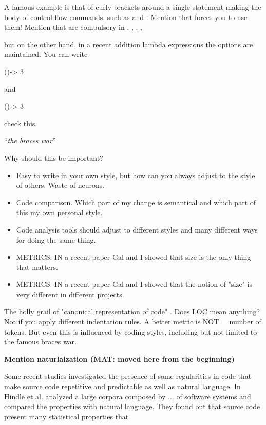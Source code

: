 A famous example is that of curly brackets around a single statement making
the body of control flow commands, such as  and 
.
Mention that \Go forces you to use them!
Mention that are compulsory in , 
,  
,  
,  

but on the other hand, in a recent addition lambda expressions\cite{lambda}
the options are maintained.
You can write
\begin{JAVA}
()-> 3
\end{JAVA}
and
\begin{JAVA}
  ()-> {3}
\end{JAVA}
check this.

``\emph{the braces war}''


Why should this be important?
\begin{itemize}
    \item Easy to write in  your own style, but how can 
      you always adjust to the style of others.
      Waste of neurons.
    \item Code comparison. Which part of my change is semantical and which 
      part of this my own personal style.
    \item Code analysis tools should adjust to different styles and many
        different ways for doing the same thing.
    \item METRICS: IN a recent paper Gal and I showed that size 
      is the only thing that matters.
    \item METRICS: IN a recent paper Gal and I showed that the notion of 
      "size" is very different in different projects.
\end{itemize}

The holly grail of "canonical representation of code" .
Does LOC mean anything?
Not if you apply different indentation rules.
A better metric is NOT = number of tokens.
But even this is influenced by coding styles, including but 
not limited to the famous braces war.

\textbf{Mention naturlaization (MAT: moved here from the beginning)}

Some recent studies investigated the presence of some regularities in code that 
make source code repetitive and predictable as well as natural language.
In Hindle et al. \cite{Hindle:Bar:Su:Gabel:Devanbu:2012} analyzed a large corpora composed
by ... of software systems and compared the properties with natural language.
They found out that source code present many statistical properties that 

